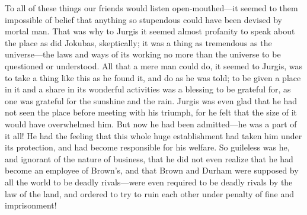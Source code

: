 \documentclass[
]{article}
\begin{document}
To all of these things our friends would listen open-mouthed---it seemed to them impossible of belief that anything so stupendous could have been devised by mortal man. That was why to Jurgis it seemed almost profanity to speak about the place as did Jokubas, skeptically; it was a thing as tremendous as the universe---the laws and ways of its working no more than the universe to be questioned or understood. All that a mere man could do, it seemed to Jurgis, was to take a thing like this as he found it, and do as he was told; to be given a place in it and a share in its wonderful activities was a blessing to be grateful for, as one was grateful for the sunshine and the rain. Jurgis was even glad that he had not seen the place before meeting with his triumph, for he felt that the size of it would have overwhelmed him. But now he had been admitted---he was a part of it all! He had the feeling that this whole huge establishment had taken him under its protection, and had become responsible for his welfare. So guileless was he, and ignorant of the nature of business, that he did not even realize that he had become an employee of Brown's, and that Brown and Durham were supposed by all the world to be deadly rivals---were even required to be deadly rivals by the law of the land, and ordered to try to ruin each other under penalty of fine and imprisonment!
\end{document}
